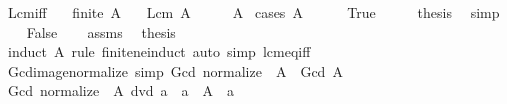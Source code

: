 \begin{isabellebody}
%
\isadelimproof
\isanewline
%
\endisadelimproof
\isanewline
{}\isamarkupfalse%
\ Lcm{\isacharunderscore}{\kern0pt}{}{\isacharunderscore}{\kern0pt}iff{\isacharcolon}{\kern0pt}\isanewline
\ \ \ {\isachardoublequoteopen}finite\ A{\isachardoublequoteclose}\isanewline
\ \ \ {\isachardoublequoteopen}Lcm\ A\ {\isacharequal}{\kern0pt}\ {}\ {\isasymlongleftrightarrow}\ {}\ {\isasymin}\ A{\isachardoublequoteclose}\isanewline
%
\isadelimproof
%
\endisadelimproof
%
\isatagproof
{}\isamarkupfalse%
\ {\isacharparenleft}{\kern0pt}cases\ {\isachardoublequoteopen}A\ {\isacharequal}{\kern0pt}\ {\isacharbraceleft}{\kern0pt}{\isacharbraceright}{\kern0pt}{\isachardoublequoteclose}{\isacharparenright}{\kern0pt}\isanewline
\ \ \isamarkupfalse%
\ True\isanewline
\ \ \isamarkupfalse%
\ \isamarkupfalse%
\ {\isacharquery}{\kern0pt}thesis\ \isamarkupfalse%
\ simp\isanewline
{}\isamarkupfalse%
\isanewline
\ \ \isamarkupfalse%
\ False\isanewline
\ \ \isamarkupfalse%
\ assms\ \isamarkupfalse%
\ {\isacharquery}{\kern0pt}thesis\isanewline
\ \ \ \ \isamarkupfalse%
\ {\isacharparenleft}{\kern0pt}induct\ A\ rule{\isacharcolon}{\kern0pt}\ finite{\isacharunderscore}{\kern0pt}ne{\isacharunderscore}{\kern0pt}induct{\isacharparenright}{\kern0pt}\ {\isacharparenleft}{\kern0pt}auto\ simp{\isacharcolon}{\kern0pt}\ lcm{\isacharunderscore}{\kern0pt}eq{\isacharunderscore}{\kern0pt}{}{\isacharunderscore}{\kern0pt}iff{\isacharparenright}{\kern0pt}\isanewline
{}\isamarkupfalse%
%
\endisatagproof
{\isafoldproof}%
%
\isadelimproof
\isanewline
%
\endisadelimproof
\isanewline
{}\isamarkupfalse%
\ Gcd{\isacharunderscore}{\kern0pt}image{\isacharunderscore}{\kern0pt}normalize\ {\isacharbrackleft}{\kern0pt}simp{\isacharbrackright}{\kern0pt}{\isacharcolon}{\kern0pt}\ {\isachardoublequoteopen}Gcd\ {\isacharparenleft}{\kern0pt}normalize\ {\isacharbackquote}{\kern0pt}\ A{\isacharparenright}{\kern0pt}\ {\isacharequal}{\kern0pt}\ Gcd\ A{\isachardoublequoteclose}\isanewline
%
\isadelimproof
%
\endisadelimproof
%
\isatagproof
{}\isamarkupfalse%
\ {\isacharminus}{\kern0pt}\isanewline
\ \ \isamarkupfalse%
\ {\isachardoublequoteopen}Gcd\ {\isacharparenleft}{\kern0pt}normalize\ {\isacharbackquote}{\kern0pt}\ A{\isacharparenright}{\kern0pt}\ dvd\ a{\isachardoublequoteclose}\ \ {\isachardoublequoteopen}a\ {\isasymin}\ A{\isachardoublequoteclose}\ \ a\isanewline

\end{isabellebody}
